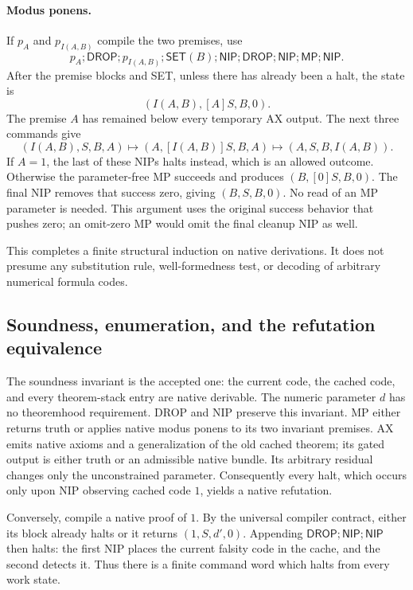 \paragraph{Modus ponens.}
If $p_A$ and $p_{I(A,B)}$ compile the two premises, use
\[
 p_A;\mathsf{DROP};p_{I(A,B)};\mathsf{SET}(B);
 \mathsf{NIP};\mathsf{DROP};\mathsf{NIP};\mathsf{MP};\mathsf{NIP}.
\]
After the premise blocks and SET, unless there has already been a halt,
the state is
\[
 (I(A,B),[A]S,B,0).
\]
The premise $A$ has remained below every temporary AX output.  The next
three commands give
\[
 (I(A,B),S,B,A)
 \longmapsto (A,[I(A,B)]S,B,A)
 \longmapsto (A,S,B,I(A,B)).
\]
If $A=1$, the last of these NIPs halts instead, which is an allowed outcome.
Otherwise the parameter-free MP succeeds and produces $(B,[0]S,B,0)$.
The final NIP removes that success zero, giving $(B,S,B,0)$.  No read of an
MP parameter is needed.  This argument uses the original success behavior
that pushes zero; an omit-zero MP would omit the final cleanup NIP as well.

This completes a finite structural induction on native derivations.  It
does not presume any substitution rule, well-formedness test, or decoding
of arbitrary numerical formula codes.

\subsection{Soundness, enumeration, and the refutation equivalence}

The soundness invariant is the accepted one: the current code, the cached
code, and every theorem-stack entry are native derivable.  The numeric
parameter $d$ has no theoremhood requirement.  DROP and NIP preserve this
invariant.  MP either returns truth or applies native modus ponens to its
two invariant premises.  AX emits native axioms and a generalization of
the old cached theorem; its gated output is either truth or an admissible
native bundle.  Its arbitrary residual changes only the unconstrained
parameter.  Consequently every halt, which occurs only upon NIP observing
cached code $1$, yields a native refutation.

Conversely, compile a native proof of $1$.  By the universal compiler
contract, either its block already halts or it returns $(1,S,d',0)$.
Appending $\mathsf{DROP};\mathsf{NIP};\mathsf{NIP}$ then halts: the first
NIP places the current falsity code in the cache, and the second detects it.
Thus there is a finite command word which halts from every work state.

